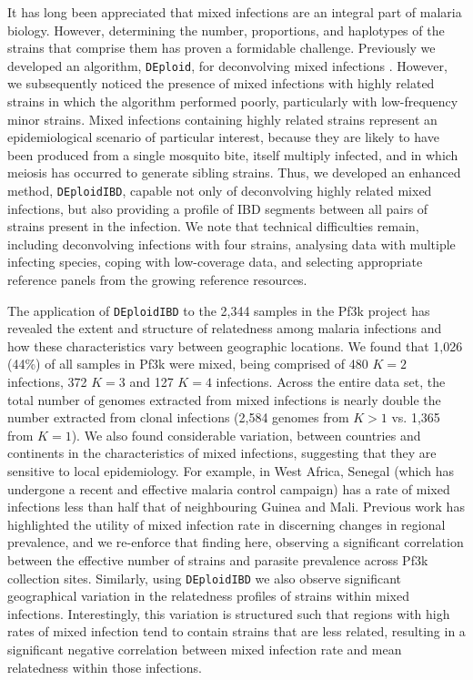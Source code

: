 \documentclass[9pt,lineno]{elife}
\begin{document}
It has long been appreciated that mixed infections are an integral part of malaria biology.  However, determining the number, proportions, and haplotypes of the strains that comprise them has proven a formidable challenge.  Previously we developed an algorithm, \texttt{DEploid}, for deconvolving mixed infections \citep{Zhu2017}.  However, we subsequently noticed the presence of mixed infections with highly related strains in which the algorithm performed poorly, particularly with low-frequency minor strains.  Mixed infections containing highly related strains represent an epidemiological scenario of particular interest, because they are likely to have been produced from a single mosquito bite, itself multiply infected, and in which meiosis has occurred to generate sibling strains. Thus, we developed an enhanced method, \texttt{DEploidIBD}, capable not only of deconvolving highly related mixed infections, but also providing a profile of IBD segments between all pairs of strains present in the infection.  We note that technical difficulties remain, including deconvolving infections with four strains, analysing data with multiple infecting species, coping with low-coverage data, and selecting appropriate reference panels from the growing reference resources.

The application of \texttt{DEploidIBD} to the 2,344 samples in the Pf3k project has revealed the extent and structure of relatedness among malaria infections and how these characteristics vary between geographic locations. We found that 1,026 (44\%) of all samples in Pf3k were mixed, being comprised of 480 $K=2$ infections, 372 $K=3$ and 127 $K=4$ infections. Across the entire data set, the total number of genomes extracted from mixed infections is nearly double the number extracted from clonal infections (2,584 genomes from $K>1$ vs. 1,365 from $K=1$).  We also found considerable variation, between countries and continents in the characteristics of mixed infections, suggesting that they are sensitive to local epidemiology.  For example, in West Africa, Senegal (which has undergone a recent and effective malaria control campaign) has a rate of mixed infections less than half that of neighbouring Guinea and Mali.  Previous work has highlighted the utility of mixed infection rate in discerning changes in regional prevalence, and we re-enforce that finding here, observing a significant correlation between the effective number of strains and parasite prevalence across Pf3k collection sites. Similarly, using \texttt{DEploidIBD} we also observe significant geographical variation in the relatedness profiles of strains within mixed infections.  Interestingly, this variation is structured such that regions with high rates of mixed infection tend to contain strains that are less related, resulting in a significant negative correlation between mixed infection rate and mean relatedness within those infections.
\end{document}
